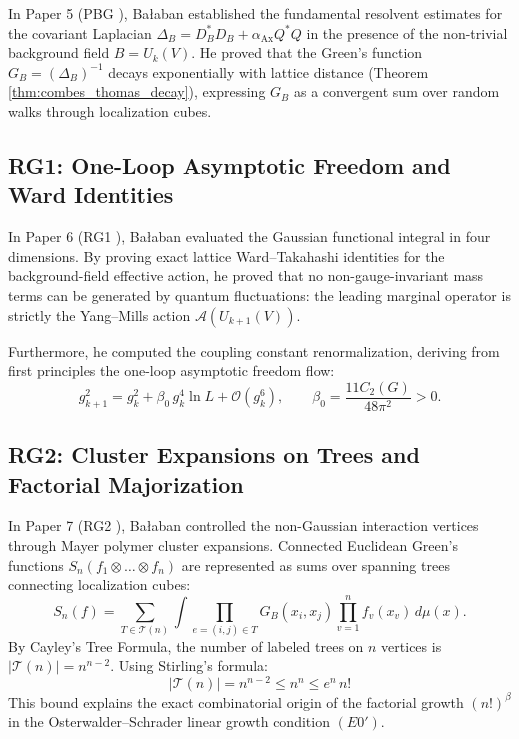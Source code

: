 In Paper 5 (PBG \cite{Balaban1985b}), Ba\l aban established the fundamental resolvent estimates for the covariant Laplacian $\Delta_B = D_B^* D_B + \alpha_{\mathrm{Ax}} Q^* Q$ in the presence of the non-trivial background field $B = U_k(V)$. He proved that the Green's function $G_B = (\Delta_B)^{-1}$ decays exponentially with lattice distance (Theorem \ref{thm:combes_thomas_decay}), expressing $G_B$ as a convergent sum over random walks through localization cubes.

\subsection{RG1: One-Loop Asymptotic Freedom and Ward Identities}
\label{subsec:rg1_summary}

In Paper 6 (RG1 \cite{Balaban1987}), Ba\l aban evaluated the Gaussian functional integral in four dimensions. By proving exact lattice Ward--Takahashi identities for the background-field effective action, he proved that no non-gauge-invariant mass terms can be generated by quantum fluctuations: the leading marginal operator is strictly the Yang--Mills action $\mathcal{A}(U_{k+1}(V))$. 

Furthermore, he computed the coupling constant renormalization, deriving from first principles the one-loop asymptotic freedom flow:
\begin{equation}
\label{eq:ch12_coupling_flow_first_principles}
g_{k+1}^2 = g_k^2 + \beta_0 \, g_k^4 \ln L + \mathcal{O}(g_k^6), \qquad \beta_0 = \frac{11 C_2(G)}{48\pi^2} > 0.
\end{equation}

\subsection{RG2: Cluster Expansions on Trees and Factorial Majorization}
\label{subsec:rg2_summary}

In Paper 7 (RG2 \cite{Balaban1988}), Ba\l aban controlled the non-Gaussian interaction vertices through Mayer polymer cluster expansions. Connected Euclidean Green's functions $S_n(f_1 \otimes \dots \otimes f_n)$ are represented as sums over spanning trees connecting localization cubes:
\begin{equation}
\label{eq:ch12_tree_cluster_rep}
S_n(f) = \sum_{T \in \mathcal{T}(n)} \int \prod_{e=(i, j) \in T} G_B(x_i, x_j) \prod_{v=1}^n f_v(x_v) \, d\mu(x).
\end{equation}
By Cayley's Tree Formula, the number of labeled trees on $n$ vertices is $|\mathcal{T}(n)| = n^{n-2}$. Using Stirling's formula:
\begin{equation}
\label{eq:ch12_cayley_stirling}
|\mathcal{T}(n)| = n^{n-2} \le n^n \le e^n \, n!
\end{equation}
This bound explains the exact combinatorial origin of the factorial growth $(n!)^\beta$ in the Osterwalder--Schrader linear growth condition $(E0')$.

